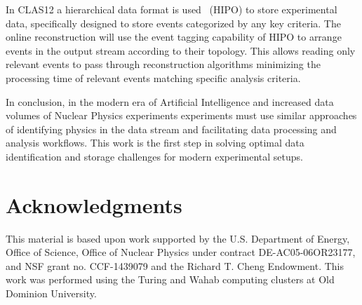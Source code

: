 \documentclass[preprint,12pt]{elsarticle}
\begin{document}
In CLAS12 a hierarchical data format is used~\cite{Gavalian:hipo} (HIPO) to store experimental data, specifically designed to store events categorized by any key criteria. The online reconstruction will use the event tagging capability of HIPO to arrange events in the output stream according to their topology. This allows reading only relevant events to pass through reconstruction algorithms minimizing the processing time of relevant events matching specific analysis criteria.

In conclusion, in the modern era of Artificial Intelligence and increased data volumes of Nuclear Physics experiments experiments must use similar approaches of identifying physics in the data stream and facilitating data processing and analysis workflows. This work is the first step in solving  optimal data identification and storage challenges for modern experimental setups.

\section{Acknowledgments}

This material is based upon work supported by the U.S. Department of Energy, Office of Science, Office of Nuclear Physics under contract DE-AC05-06OR23177, and
 NSF grant no. CCF-1439079 and the Richard T. Cheng Endowment. This work was performed using the Turing and  Wahab computing clusters at Old Dominion University.
 
\end{document}
